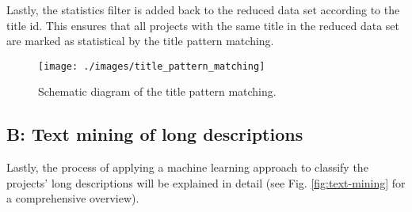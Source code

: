 \documentclass[
]{article}
\begin{document}
Lastly, the statistics filter is added back to the reduced data set according to the title id. This ensures that all projects with the same title in the reduced data set are marked as statistical by the title pattern matching.

\begin{figure}

{\centering \texttt{[image: ./images/title\_pattern\_matching]} 

}

\caption{Schematic diagram of the title pattern matching.}\label{fig:title-pattern-matching}
\end{figure}

\hypertarget{b-text-mining-of-long-descriptions}{%
\subsection{\texorpdfstring{\textbf{B}: Text mining of long descriptions}{B: Text mining of long descriptions}}\label{b-text-mining-of-long-descriptions}}

Lastly, the process of applying a machine learning approach to classify the projects' long descriptions will be explained in detail (see Fig. \ref{fig:text-mining} for a comprehensive overview).
\end{document}
